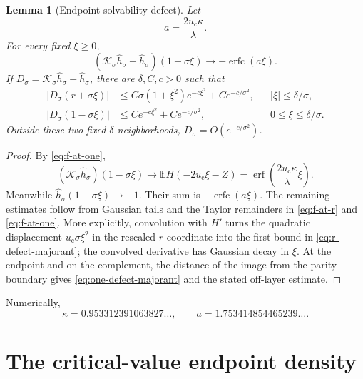 \documentclass[11pt]{article}
\newtheorem{lemma}[theorem]{Lemma}
\theoremstyle{definition}
\theoremstyle{remark}
\newcommand{\uc}{u_{\mathrm c}}
\newcommand{\cK}{\mathcal K}
\newcommand{\erfop}{\operatorname{erf}}
\newcommand{\erfcop}{\operatorname{erfc}}
\begin{document}
\begin{lemma}[Endpoint solvability defect]
\label{lem:endpoint-defect}
Let
\begin{equation}\label{eq:a-definition}
 a=\frac{2\uc\kappa}{\lambda}.
\end{equation}
For every fixed $\xi\ge0$,
\begin{equation}\label{eq:endpoint-defect}
 (\cK_\sigma\widehat h_\sigma+\widehat h_\sigma)
 (1-\sigma\xi)
 \longrightarrow-\erfcop(a\xi).
\end{equation}
If $D_\sigma=\cK_\sigma\widehat h_\sigma+\widehat h_\sigma$, there are
$\delta,C,c>0$ such that
\begin{align}
 |D_\sigma(r+\sigma\xi)|
 &\le C\sigma(1+\xi^2)e^{-c\xi^2}+Ce^{-c/\sigma^2},
 && |\xi|\le\delta/\sigma,
 \label{eq:r-defect-majorant}\\
 |D_\sigma(1-\sigma\xi)|
 &\le Ce^{-c\xi^2}+Ce^{-c/\sigma^2},
 && 0\le\xi\le\delta/\sigma.
 \label{eq:one-defect-majorant}
\end{align}
Outside these two fixed $\delta$-neighborhoods, $D_\sigma=O(e^{-c/\sigma^2})$.
\end{lemma}

\begin{proof}
By \eqref{eq:f-at-one},
\[
 (\cK_\sigma\widehat h_\sigma)(1-\sigma\xi)
 \longrightarrow
 \mathbb E H(-2\uc\xi-Z)
 =\erfop\!\left(\frac{2\uc\kappa}{\lambda}\xi\right).
\]
Meanwhile $\widehat h_\sigma(1-\sigma\xi)\to-1$.  Their sum is
$-\erfcop(a\xi)$.  The remaining estimates follow from Gaussian tails and
the Taylor remainders in \eqref{eq:f-at-r} and \eqref{eq:f-at-one}.  More
explicitly, convolution with $H'$ turns the quadratic displacement
$\uc\sigma\xi^2$ in the rescaled $r$-coordinate into the first bound in
\eqref{eq:r-defect-majorant}; the convolved derivative has Gaussian decay in
$\xi$.  At the endpoint and on the complement, the distance of the image
from the parity boundary gives \eqref{eq:one-defect-majorant} and the stated
off-layer estimate.
\end{proof}

Numerically,
\begin{equation}\label{eq:profile-constants}
 \kappa=0.953312391063827\ldots,
 \qquad
 a=1.753414854465239\ldots.
\end{equation}

\section{The critical-value endpoint density}
\label{sec:right-layer}
\end{document}
